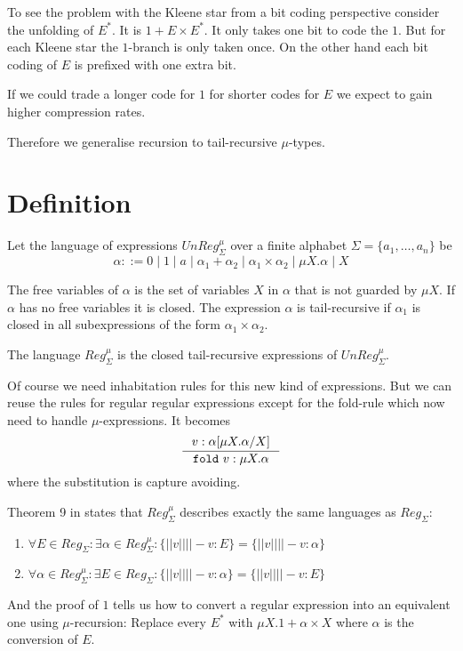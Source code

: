 \documentclass[a4paper, oneside]{memoir}
\theoremstyle{definition}
\begin{document}
To see the problem with the Kleene star from a bit coding perspective consider
the unfolding of $E^{\ast}$. It is $1 + E \times E^{\ast}$. It only takes one
bit to code the $1$. But for each Kleene star the $1$-branch is only taken
once. On the other hand each bit coding of $E$ is prefixed with one extra
bit.

If we could trade a longer code for $1$ for shorter codes for $E$ we expect to
gain higher compression rates.

Therefore we generalise recursion to tail-recursive $\mu$-types.

\section{Definition}
Let the language of expressions $UnReg_{\Sigma}^{\mu}$ over a finite alphabet
$\Sigma = \{a_1, \ldots, a_n\}$ be
\[
\alpha ::= 0 \; | \; 1 \; | \; a \; | \; \alpha_1 + \alpha_2 \; | \; \alpha_1
\times \alpha_2 \; | \; \mu X. \alpha \; | \; X
\]

The free variables of $\alpha$ is the set of variables $X$ in $\alpha$ that is
not guarded by $\mu X$. If $\alpha$ has no free variables it is closed. The
expression $\alpha$ is tail-recursive if $\alpha_1$ is closed in all
subexpressions of the form $\alpha_1 \times \alpha_2$.

The language $Reg_{\Sigma}^{\mu}$ is the closed tail-recursive expressions of
$UnReg_{\Sigma}^{\mu}$.

Of course we need inhabitation rules for this new kind of expressions. But we
can reuse the rules for regular regular expressions except for the fold-rule
which now need to handle $\mu$-expressions. It becomes
\[
\inference{v : \alpha \lbrack \mu X. \alpha / X \rbrack}{\mathtt{fold}\ v : \mu X. \alpha}
\]
where the substitution is capture avoiding.

Theorem 9 in \cite{heni2010} states that $Reg_{\Sigma}^{\mu}$ describes exactly
the same languages as $Reg_{\Sigma}$:

\begin{enumerate}
\item $\forall E \in Reg_{\Sigma} : \exists \alpha \in Reg_{\Sigma}^{\mu} :
  \{||v|| | |- v : E\} = \{||v|| | |- v : \alpha \}$
\item $\forall \alpha \in Reg_{\Sigma}^{\mu} : \exists E \in Reg_{\Sigma} :
  \{||v|| | |- v : \alpha\} = \{||v|| | |- v : E \}$
\end{enumerate}

And the proof of $1$ tells us how to convert a regular expression into an
equivalent one using $\mu$-recursion: Replace every $E^{\ast}$ with $\mu X.1 +
\alpha \times X$ where $\alpha$ is the conversion of $E$.
\end{document}
